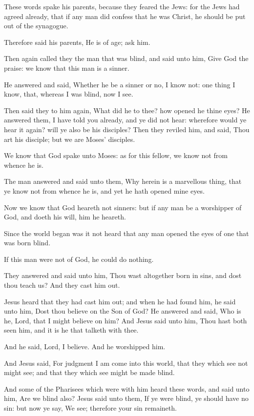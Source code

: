 \verse These words spake his parents, because they feared the Jews: for the Jews had agreed already, that if any man did confess that he was Christ, he should be put out of the synagogue.

\verse Therefore said his parents, He is of age; ask him.

\verse Then again called they the man that was blind, and said unto him, Give God the praise: we know that this man is a sinner.

\verse He answered and said, Whether he be a sinner or no, I know not: one thing I know, that, whereas I was blind, now I see.

\verse Then said they to him again, What did he to thee? how opened he thine eyes?  \verse He answered them, I have told you already, and ye did not hear: wherefore would ye hear it again? will ye also be his disciples?  \verse Then they reviled him, and said, Thou art his disciple; but we are Moses' disciples.

\verse We know that God spake unto Moses: as for this fellow, we know not from whence he is.

\verse The man answered and said unto them, Why herein is a marvellous thing, that ye know not from whence he is, and yet he hath opened mine eyes.

\verse Now we know that God heareth not sinners: but if any man be a worshipper of God, and doeth his will, him he heareth.

\verse Since the world began was it not heard that any man opened the eyes of one that was born blind.

\verse If this man were not of God, he could do nothing.

\verse They answered and said unto him, Thou wast altogether born in sins, and dost thou teach us? And they cast him out.

\verse Jesus heard that they had cast him out; and when he had found him, he said unto him, Dost thou believe on the Son of God?  \verse He answered and said, Who is he, Lord, that I might believe on him?  \verse And Jesus said unto him, Thou hast both seen him, and it is he that talketh with thee.

\verse And he said, Lord, I believe. And he worshipped him.

\verse And Jesus said, For judgment I am come into this world, that they which see not might see; and that they which see might be made blind.

\verse And some of the Pharisees which were with him heard these words, and said unto him, Are we blind also?  \verse Jesus said unto them, If ye were blind, ye should have no sin: but now ye say, We see; therefore your sin remaineth.


